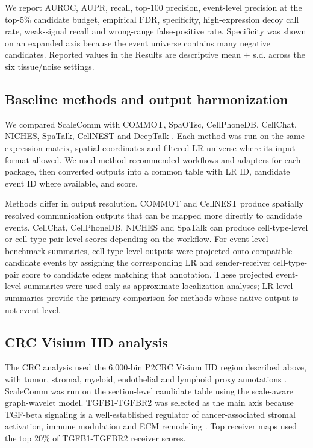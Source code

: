 \documentclass[referee,lineno,pdflatex,sn-vancouver-num]{sn-jnl}
\begin{document}
We report AUROC, AUPR, recall, top-100 precision, event-level precision at the top-5\% candidate budget, empirical FDR, specificity, high-expression decoy call rate, weak-signal recall and wrong-range false-positive rate. Specificity was shown on an expanded axis because the event universe contains many negative candidates. Reported values in the Results are descriptive mean $\pm$ s.d. across the six tissue/noise settings.

\subsection{Baseline methods and output harmonization}

We compared ScaleComm with COMMOT, SpaOTsc, CellPhoneDB, CellChat, NICHES, SpaTalk, CellNEST and DeepTalk \citep{commot2023,spaotsc2020,cellphonedb2020,cellchat2021,niches2023,spatalk2022,cellnest2025,deeptalk2024}. Each method was run on the same expression matrix, spatial coordinates and filtered LR universe where its input format allowed. We used method-recommended workflows and adapters for each package, then converted outputs into a common table with LR ID, candidate event ID where available, and score.

Methods differ in output resolution. COMMOT and CellNEST produce spatially resolved communication outputs that can be mapped more directly to candidate events. CellChat, CellPhoneDB, NICHES and SpaTalk can produce cell-type-level or cell-type-pair-level scores depending on the workflow. For event-level benchmark summaries, cell-type-level outputs were projected onto compatible candidate events by assigning the corresponding LR and sender-receiver cell-type-pair score to candidate edges matching that annotation. These projected event-level summaries were used only as approximate localization analyses; LR-level summaries provide the primary comparison for methods whose native output is not event-level.

\subsection{CRC Visium HD analysis}

The CRC analysis used the 6,000-bin P2CRC Visium HD region described above, with tumor, stromal, myeloid, endothelial and lymphoid proxy annotations \citep{oliveira2025visiumhdcrc}. ScaleComm was run on the section-level candidate table using the scale-aware graph-wavelet model. TGFB1-TGFBR2 was selected as the main axis because TGF-beta signaling is a well-established regulator of cancer-associated stromal activation, immune modulation and ECM remodeling \citep{massague2008tgfb,calon2012tgfb,calon2015stroma,tauriello2018tgfb,mariathasan2018tgfb}. Top receiver maps used the top 20\% of TGFB1-TGFBR2 receiver scores.
\end{document}
